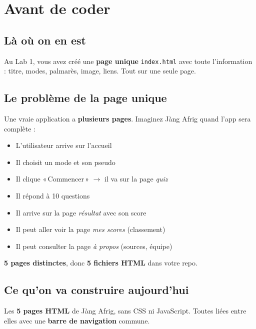 \documentclass[11pt,a4paper]{article}
\begin{document}
\tableofcontents

\newpage

\section{Avant de coder}

\subsection{Là où on en est}

Au Lab 1, vous avez créé une \textbf{page unique} \texttt{index.html} avec
toute l'information : titre, modes, palmarès, image, liens. Tout sur une
seule page.

\subsection{Le problème de la page unique}

Une vraie application a \textbf{plusieurs pages}. Imaginez Jàng Afrig
quand l'app sera complète :

\begin{itemize}[nosep]
    \item L'utilisateur arrive sur l'accueil
    \item Il choisit un mode et son pseudo
    \item Il clique «\,Commencer\,» $\to$ il va sur la page \emph{quiz}
    \item Il répond à 10 questions
    \item Il arrive sur la page \emph{résultat} avec son score
    \item Il peut aller voir la page \emph{mes scores} (classement)
    \item Il peut consulter la page \emph{à propos} (sources, équipe)
\end{itemize}

\textbf{5 pages distinctes}, donc \textbf{5 fichiers HTML} dans votre repo.

\subsection{Ce qu'on va construire aujourd'hui}

Les \textbf{5 pages HTML} de Jàng Afrig, sans CSS ni JavaScript. Toutes
liées entre elles avec une \textbf{barre de navigation} commune.
\end{document}

